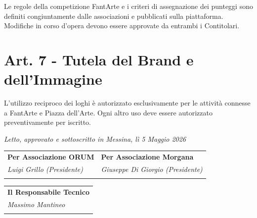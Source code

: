 \documentclass[a4paper,11pt]{article}
\begin{document}
Le regole della competizione FantArte e i criteri di assegnazione dei punteggi sono definiti congiuntamente dalle associazioni e pubblicati sulla piattaforma. Modifiche in corso d'opera devono essere approvate da entrambi i Contitolari.

\section*{Art. 7 - Tutela del Brand e dell'Immagine}

L'utilizzo reciproco dei loghi è autorizzato esclusivamente per le attività connesse a FantArte e Piazza dell'Arte. Ogni altro uso deve essere autorizzato preventivamente per iscritto.

\vfill

\noindent\begin{minipage}{\textwidth}
\textit{Letto, approvato e sottoscritto in Messina, lì 5 Maggio 2026}

\vspace{1cm}

\noindent
\begin{tabular}{@{}p{} p{}@{}}
    \textbf{Per Associazione ORUM} & \textbf{Per Associazione Morgana} \\
    \textit{Luigi Grillo (Presidente)} & \textit{Giuseppe Di Giorgio (Presidente)} \\
    \vspace{0.8cm} \hrulefill & \vspace{0.8cm} \hrulefill \\
\end{tabular}

\vspace{1cm}

\noindent
\begin{tabular}{@{}p{}@{}}
    \textbf{Il Responsabile Tecnico} \\
    \textit{Massimo Mantineo} \\
    \vspace{0.8cm} \hrulefill \\
\end{tabular}
\end{minipage}
\end{document}
